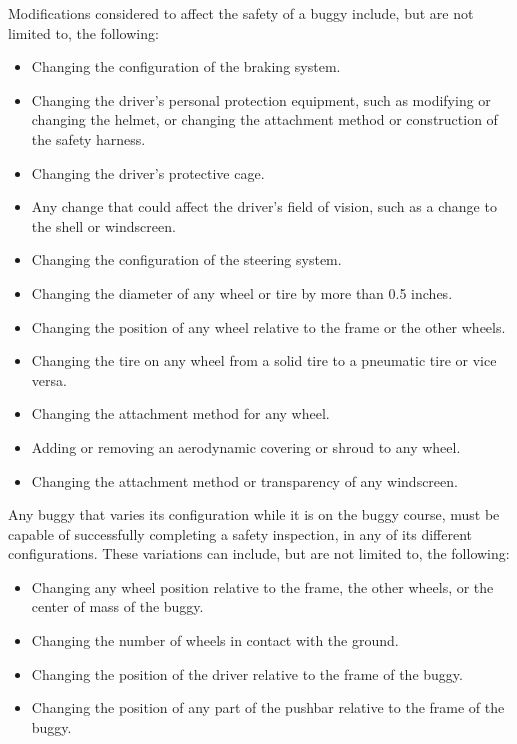	\noindent Modifications considered to affect the safety of a buggy include, but are
	not limited to, the following:
	
	\begin{itemize}
		\item Changing the configuration of the braking system.
		\item Changing the driver's personal protection equipment, such as modifying or
				changing the helmet, or changing the attachment method or construction of the
				safety harness.
		\item Changing the driver's protective cage.
		\item Any change that could affect the driver's field of vision, such as a change to the shell or windscreen.
		\item Changing the configuration of the steering system.
		\item Changing the diameter of any wheel or tire by more than 0.5 inches.
		\item Changing the position of any wheel relative to the frame or the other wheels.
		\item Changing the tire on any wheel from a solid tire to a pneumatic tire or vice versa.
		\item Changing the attachment method for any wheel.
		\item Adding or removing an aerodynamic covering or shroud to any wheel.
		\item Changing the attachment method or transparency of any windscreen.
	\end{itemize}

	\noindent Any buggy that varies its configuration while it is on the buggy course, must
	be capable of successfully completing a safety inspection, in any of its
	different configurations. These variations can include, but are not limited to,
	the following:

	\begin{itemize}
		\item Changing any wheel position relative to the frame, the other wheels, or the center of mass of the buggy.
		\item Changing the number of wheels in contact with the ground.
		\item Changing the position of the driver relative to the frame of the buggy.
		\item Changing the position of any part of the pushbar relative to the frame of the buggy.
	\end{itemize}


